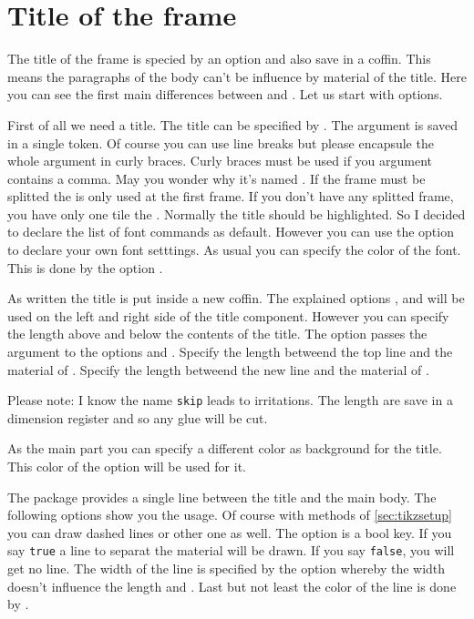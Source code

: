 \documentclass[openany,12pt,tocdepth=3]{ltx-md}
\begin{document}
\section{Title of the frame}\label{sec:element-firsttitle}
The title of the frame is specied by an option and also save in a coffin. 
This means the paragraphs of the body can't be influence by material
of the title. Here you can see the first main differences between
 and . Let us start with options.

First of all we need a title. The title can be specified by . The argument
is saved in a single token. Of course you can use line breaks but please encapsule
the whole argument in curly braces. Curly braces must be used if you argument contains
a comma. May you wonder why it's named . If the frame
must be splitted the  is only used at the first frame. If
you don't have any splitted frame, you have only one tile the .
Normally the title should be highlighted. So I decided to declare the list of
font commands as default. However you can use the option  to
declare your own font setttings.
As usual you can specify the color of the font. This is done by the option
.

As written the title is put inside a new coffin. The explained options ,
 and  will be used on the left and right side of
the title component. However you can specify the length above and below the contents of the title. 
The option  passes the argument to the options 
and .
Specify the length betweend the top line and the material of .
Specify the length betweend the new line  and the material of .

\faArrowRight Please note:  I know the name \texttt{skip} leads to irritations. The length are save in a
dimension register and so any glue will be cut.

As the main part you can specify a different color as background for
the title. This color of the option  will be used for it.


The package  provides a single line between the title and the main body.
The following options show you the usage. Of course with methods of
\autoref{sec:tikzsetup} you can draw dashed lines or other one as well.
The option  is a bool key. If you say \texttt{true} a line to separat
the material will be drawn. If you say \texttt{false}, you will get no line.
The width of the line is specified by the option  whereby
the width doesn't influence the length  and .
Last but not least the color of the line is done by .
\end{document}
